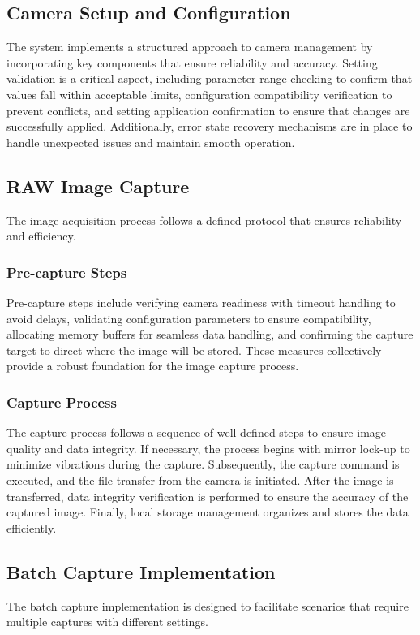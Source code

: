 \subsection{Camera Setup and Configuration}
The system implements a structured approach to camera management by incorporating key components that ensure reliability and accuracy. Setting validation is a critical aspect, including parameter range checking to confirm that values fall within acceptable limits, configuration compatibility verification to prevent conflicts, and setting application confirmation to ensure that changes are successfully applied. Additionally, error state recovery mechanisms are in place to handle unexpected issues and maintain smooth operation.

\subsection{RAW Image Capture}
The image acquisition process follows a defined protocol that ensures reliability and efficiency.

\subsubsection{Pre-capture Steps}
Pre-capture steps include verifying camera readiness with timeout handling to avoid delays, validating configuration parameters to ensure compatibility, allocating memory buffers for seamless data handling, and confirming the capture target to direct where the image will be stored. These measures collectively provide a robust foundation for the image capture process.

\subsubsection{Capture Process}
The capture process follows a sequence of well-defined steps to ensure image quality and data integrity. If necessary, the process begins with mirror lock-up to minimize vibrations during the capture. Subsequently, the capture command is executed, and the file transfer from the camera is initiated. After the image is transferred, data integrity verification is performed to ensure the accuracy of the captured image. Finally, local storage management organizes and stores the data efficiently.

\subsection{Batch Capture Implementation}
The batch capture implementation is designed to facilitate scenarios that require multiple captures with different settings.

